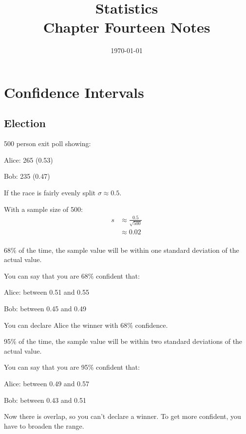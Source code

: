 \documentclass[letterpaper, landscape]{exam}
\title{Statistics \\ Chapter Fourteen Notes}
\date{\today}
\author{}
\begin{document}
  \maketitle
  \tableofcontents

  \section{Confidence Intervals}

  \subsection{Election}

  500 person exit poll showing:
  \begin{itemize*}
    \item Alice: 265 (0.53)
    \item Bob: 235 (0.47)
  \end{itemize*}

  If the race is fairly evenly split $\sigma \approx 0.5$. 

  With a sample size of 500:
  \begin{align*}
    s & \approx \frac{0.5}{\sqrt{500}} \\
      & \approx 0.02 \\
  \end{align*}

  68\% of the time, the sample value will be within one standard deviation of
  the actual value. 
  
  You can say that you are 68\% confident that:
  \begin{itemize*}
    \item Alice: between 0.51 and 0.55
    \item Bob: between 0.45 and 0.49
  \end{itemize*}

  You can declare Alice the winner with 68\% confidence.

  95\% of the time, the sample value will be within two standard deviations of
  the actual value. 
  
  You can say that you are 95\% confident that:
  \begin{itemize*}
    \item Alice: between 0.49 and 0.57
    \item Bob: between 0.43 and 0.51
  \end{itemize*}

  Now there is overlap, so you can't declare a winner. To get more confident,
  you have to broaden the range.
\end{document}
